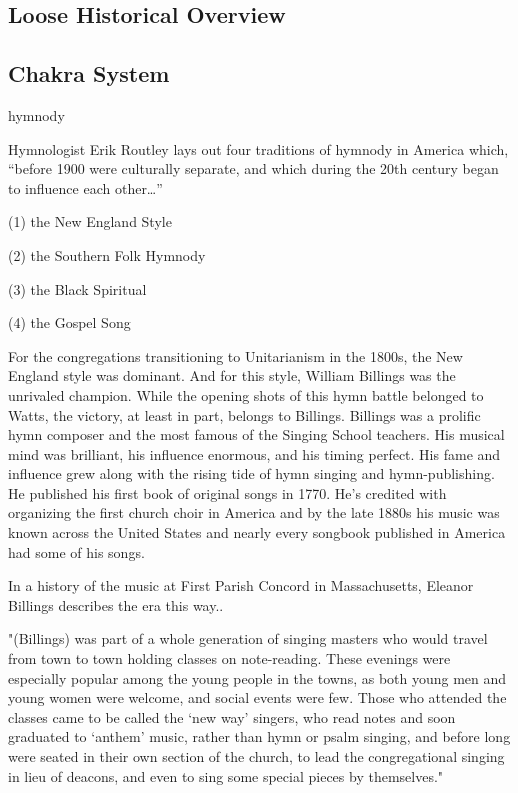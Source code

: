 \documentclass[12pt]{article}
\begin{document}
\subsection*{Loose Historical Overview}

\subsection*{Chakra System}

hymnody

Hymnologist Erik Routley lays out four traditions of hymnody in America which, “before 1900 were culturally separate, and which during the 20th century began to influence each other…”

(1) the New England Style

(2) the Southern Folk Hymnody

(3) the Black Spiritual

(4) the Gospel Song

For the congregations transitioning to Unitarianism in the 1800s, the New England style was dominant. And for this style, William Billings was the unrivaled champion. While the opening shots of this hymn battle belonged to Watts, the victory, at least in part, belongs to Billings. Billings was a prolific hymn composer and the most famous of the Singing School teachers. His musical mind was brilliant, his influence enormous, and his timing perfect. His fame and influence grew along with the rising tide of hymn singing and hymn-publishing. He published his first book of original songs in 1770. He’s credited with organizing the first church choir in America and by the late 1880s his music was known across the United States and nearly every songbook published in America had some of his songs.

In a history of the music at First Parish Concord in Massachusetts, Eleanor Billings describes the era this way..

"(Billings) was part of a whole generation of singing masters who would travel from town to town holding classes on note-reading. These evenings were especially popular among the young people in the towns, as both young men and young women were welcome, and social events were few. Those who attended the classes came to be called the ‘new way’ singers, who read notes and soon graduated to ‘anthem’ music, rather than hymn or psalm singing, and before long were seated in their own section of the church, to lead the congregational singing in lieu of deacons, and even to sing some special pieces by themselves."
\end{document}
